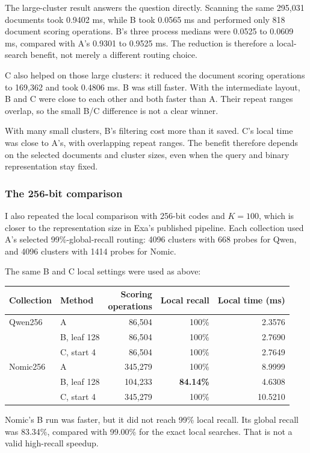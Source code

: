 The large-cluster result answers the question directly. Scanning the same 295,031 documents took 0.9402 ms, while B took 0.0565 ms and performed only 818 document scoring operations. B's three process medians were 0.0525 to 0.0609 ms, compared with A's 0.9301 to 0.9525 ms. The reduction is therefore a local-search benefit, not merely a different routing choice.

C also helped on those large clusters: it reduced the document scoring operations to 169,362 and took 0.4806 ms. B was still faster. With the intermediate layout, B and C were close to each other and both faster than A. Their repeat ranges overlap, so the small B/C difference is not a clear winner.

With many small clusters, B's filtering cost more than it saved. C's local time was close to A's, with overlapping repeat ranges. The benefit therefore depends on the selected documents and cluster sizes, even when the query and binary representation stay fixed.

\subsubsection{The 256-bit comparison}
I also repeated the local comparison with 256-bit codes and $K=100$, which is closer to the representation size in Exa's published pipeline. Each collection used A's selected 99\%-global-recall routing: 4096 clusters with 668 probes for Qwen, and 4096 clusters with 1414 probes for Nomic.

The same B and C local settings were used as above:
\begin{center}\small
\begin{tabular}{@{}llrrr@{}}\toprule
Collection & Method & \shortstack{Scoring\\operations} & Local recall & Local time (ms)\\\midrule
Qwen256 & A & 86,504 & 100\% & 2.3576\\
 & B, leaf 128 & 86,504 & 100\% & 2.7690\\
 & C, start 4 & 86,504 & 100\% & 2.7649\\\midrule
Nomic256 & A & 345,279 & 100\% & 8.9999\\
 & B, leaf 128 & 104,233 & \textbf{84.14\%} & 4.6308\\
 & C, start 4 & 345,279 & 100\% & 10.5210\\\bottomrule
\end{tabular}
\end{center}
Nomic's B run was faster, but it did not reach 99\% local recall. Its global recall was 83.34\%, compared with 99.00\% for the exact local searches. That is not a valid high-recall speedup.

